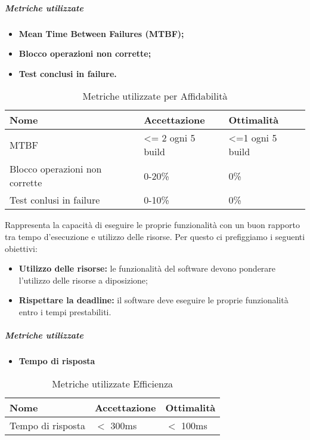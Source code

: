\subparagraph{Metriche utilizzate}
\begin{itemize}
	\item \textbf{Mean Time Between Failures (MTBF)\pedice;}
	\item \textbf{Blocco operazioni non corrette;}
	\item \textbf{Test conclusi in failure.}
\end{itemize}
\begin{table}[!htpb]
	\centering
	\renewcommand{\arraystretch}{2} 
	\begin{tabular}{|l|l|l|}
		\rowcolor{orange!50}
		\hline
		\textbf{Nome} &  \textbf{Accettazione} & \textbf{Ottimalità} \\ \hline
		MTBF     &     \textless= 2 ogni 5 build       &     \textless=1 ogni 5 build          \\ \hline
		Blocco operazioni non corrette   &    0-20\% &  0\%       \\ \hline
		Test conlusi in failure          &     0-10\%          &      0\%        \\ \hline
	\end{tabular}
	\caption{Metriche utilizzate per Affidabilità}
\end{table}
Rappresenta la capacità di eseguire le proprie funzionalità con un buon rapporto tra tempo d'esecuzione e utilizzo delle risorse. Per questo ci prefiggiamo i seguenti obiettivi:
\begin{itemize}
	\item \textbf{Utilizzo delle risorse:} le funzionalità del software devono ponderare l'utilizzo delle risorse a diposizione;
	\item \textbf{Rispettare la deadline:} il software deve eseguire le proprie funzionalità entro i tempi prestabiliti.
\end{itemize}

\subparagraph{Metriche utilizzate}
\begin{itemize}
	\item \textbf{Tempo di risposta}
\end{itemize}
\begin{table}[!htpb]
	\centering
	\renewcommand{\arraystretch}{2} 
		\begin{tabular}{|l|l|l|}
			\rowcolor{orange!50}
			\hline
			\textbf{Nome} & \textbf{Accettazione} & \textbf{Ottimalità} \\ \hline
			Tempo di risposta        &           $<$ 300ms            &      $<$ 100ms         \\ \hline                       
		\end{tabular}
	\caption{Metriche utilizzate Efficienza}
\end{table}

